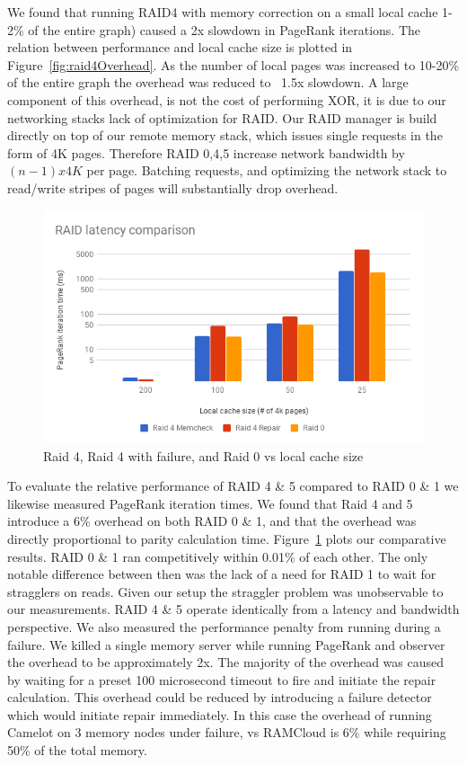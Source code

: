 We found that running RAID4 with memory correction on a small local
cache 1-2\% of the entire graph) caused a 2x slowdown in PageRank
iterations. The relation between performance and local cache size is
plotted in Figure~\ref{fig:raid4Overhead}. As the number of local
pages was increased to 10-20\% of the entire graph the overhead was
reduced to ~1.5x slowdown. A large component of this overhead, is not
the cost of performing XOR, it is due to our networking stacks lack of
optimization for RAID. Our RAID manager is build directly on top of
our remote memory stack, which issues single requests in the form of 4K
pages. Therefore RAID 0,4,5 increase network bandwidth by $(n-1)x4K$
per page. Batching requests, and optimizing the network stack to
read/write stripes of pages will substantially drop overhead.

\begin{figure}[H]
    \includegraphics[width=\columnwidth]{fig/RaidComparison}
    \caption{Raid 4, Raid 4 with failure, and Raid 0 vs local cache size}
    \label{fig:RaidComparison}
\end{figure}

To evaluate the relative performance of RAID 4 \& 5 compared to RAID
0 \& 1 we likewise measured PageRank iteration times. We found that
Raid 4 and 5 introduce a 6\% overhead on both RAID 0 \& 1, and that
the overhead was directly proportional to parity calculation time.
Figure~\ref{fig:RaidComparison} plots our comparative results. RAID 0
\& 1 ran competitively within 0.01\% of each other. The only notable
difference between then was the lack of a need for RAID 1 to wait for
stragglers on reads. Given our setup the straggler problem was
unobservable to our measurements. RAID 4 \& 5 operate identically from
a latency and bandwidth perspective. We also measured the performance
penalty from running during a failure. We killed a single memory
server while running PageRank and observer the overhead to be
approximately 2x. The majority of the overhead was caused by waiting for
a preset 100 microsecond timeout to fire and initiate the repair
calculation. This overhead could be reduced by introducing a failure
detector which would initiate repair immediately. In this case the
overhead of running Camelot on 3 memory nodes under failure, vs
RAMCloud is 6\% while requiring 50\% of the total memory.

